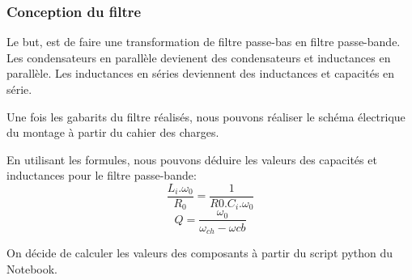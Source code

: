 \begin{itemize}
    \newpage
    \subsubsection{Conception du filtre}
    
    \begin{flushleft}
        Le but, est de faire une transformation de filtre passe-bas en filtre passe-bande. Les condensateurs en parallèle devienent des condensateurs et inductances en parallèle.
        Les inductances en séries deviennent des inductances et capacités en série.
    \end{flushleft}
    
    \begin{flushleft}
        Une fois les gabarits du filtre réalisés, nous pouvons réaliser le schéma électrique du montage à partir du cahier des charges.
    \end{flushleft}
    
    \begin{figure}[!htbp]
         
    \end{figure}
    \FloatBarrier
    
    \begin{flushleft}
        En utilisant les formules, nous pouvons déduire les valeurs des capacités et inductances pour le filtre passe-bande:
        $$ \frac{L_i.\omega_{0}}{R_0} = \frac{1}{R0.C_i.\omega_0}$$
        $$ Q = \frac{\omega_0}{\omega_{ch}-\omega{cb}}$$
    \end{flushleft}
    \begin{flushleft}
        On décide de calculer les valeurs des composants à partir du script python du Notebook.
    \end{flushleft}
    

\end{itemize}
